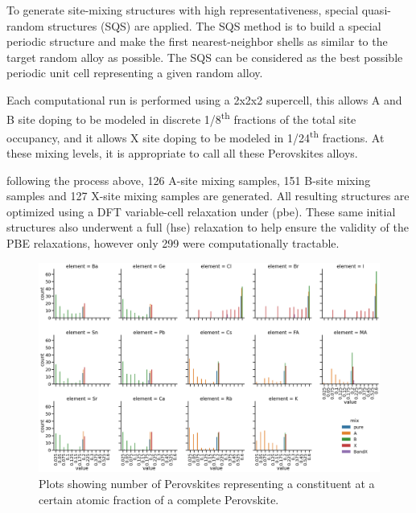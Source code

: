 \documentclass[twoside, twocolumn, 9pt, draft]{article}
\begin{document}
To generate site-mixing structures with high representativeness,
special quasi-random structures (SQS) are applied. The SQS method is
to build a special periodic structure and make the first
nearest-neighbor shells as similar to the target random alloy as
possible. The SQS can be considered as the best possible periodic unit
cell representing a given random alloy.

Each computational run is performed using a 2x2x2 supercell, this
allows A and B site doping to be modeled in discrete 1/8\textsuperscript{th} fractions
of the total site occupancy, and it allows X site doping to be modeled
in 1/24\textsuperscript{th} fractions. At these mixing levels, it is appropriate to
call all these Perovskites alloys.

following the process above, 126 A-site mixing samples, 151 B-site
mixing samples and 127 X-site mixing samples are generated. All
resulting structures are optimized using a DFT variable-cell
relaxation under \acr(pbe). These same initial structures also
underwent a full \acr(hse) relaxation to help ensure the validity of
the PBE relaxations, however only 299 were computationally tractable.

\begin{figure}
\centering
\includegraphics[width=.9\linewidth]{variability_of_composition_vectors.png}
\caption{\label{fig:chemspace_uni} Plots showing number of Perovskites representing a constituent at a certain atomic fraction of a complete Perovskite.}
\end{figure}
\end{document}
